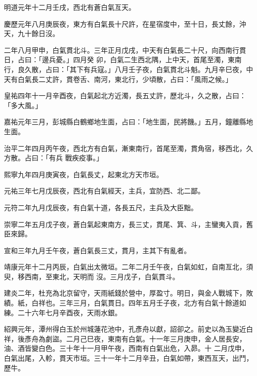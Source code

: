 \begin{pinyinscope}
 明道元年十二月壬戌，西北有蒼白氣亙天。



 慶歷元年八月庚辰夜，東方有白氣長十尺許，在星宿度中，至十日，長丈餘，沖天，九十餘日沒。



 二年八月甲申，白氣貫北斗。三年正月戊戌，中天有白氣長二十尺，向西南行貫日，占曰：「邊兵憂。」四月癸
 卯，白氣二生西北隅，上中天，首尾至濁，東南行，良久散，占曰：「其下有兵寇。」八月壬子夜，白氣貫北斗魁。九月辛巳夜，中天有白氣長二丈許，貫卷舌、南河，東北行，少頃散，占曰：「風雨之候。」



 皇祐四年十一月辛酉夜，白氣起北方近濁，長五丈許，歷北斗，久之散，占曰：「多大風。」



 嘉祐元年三月，彭城縣白鶴鄉地生面，占曰：「地生面，民將饑。」五月，鐘離縣地生面。



 治平二年四月丙午夜，西北方有白氣，漸東南行，首尾至濁，貫角宿，移西北，久方散。占曰：「有兵
 戰疾疫事。」



 熙寧九年四月庚寅夜，白氣長丈，起東北方天市垣。



 元祐三年七月戊辰夜，西北有白氣經天，主兵，宜防西、北二鄙。



 元符二年九月戊辰夜，有白氣十道，各長五尺，主兵及大臣黜。



 崇寧二年五月戊子夜，蒼白氣起東南方，長三丈，貫尾、箕、斗，主蠻夷入貢，舊臣來歸。



 宣和三年九月壬午夜，蒼白氣長三丈，貫月，主其下有亂者。



 靖康元年十二月丙辰，白氣出太微垣。二年二月壬午夜，白氣如虹，自南亙北，須臾，移西南，至東北，天明而
 沒。三月戊子，白氣貫斗。



 建炎二年，杜充為北京留守，天雨紙錢於營中，厚盈寸。明日，與金人戰城下，敗績。紙，白祥也。三年三月，白氣貫日。四年五月壬子夜，北方有白氣十餘道如練。二十六年七月辛酉夜，天雨水銀。



 紹興元年，潭州得白玉於州城蓮花池中，孔彥舟以獻，詔卻之。前史以為玉變近白祥，後彥舟為劇盜。二月己巳夜，東南有白氣。十一年三月庚申，金人居長安，油、酒皆變白色。三十年十一月甲午夜，西南有白氣出危，入昴。十
 二月戊申，白氣出尾，入軫，貫天市垣。三十一年十二月辛丑，白氣如帶，東西亙天，出鬥，歷牛。




\end{pinyinscope}
